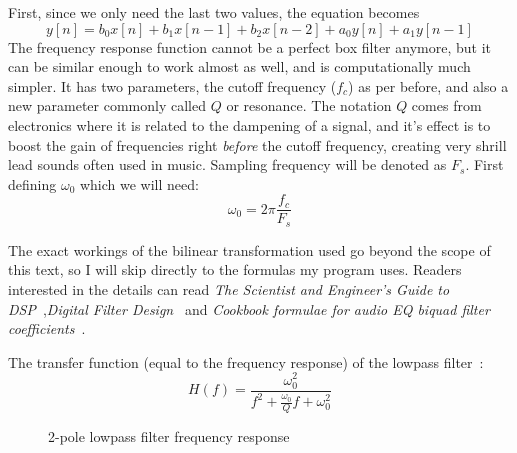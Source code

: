 \documentclass[11pt,a4paper]{article}
\begin{document}
First, since we only need the last two values, the equation becomes
\begin{equation}
y[n] = b_0x[n] + b_1x[n-1] + b_2x[n-2] + a_0y[n] + a_1y[n-1]
\end{equation}
The frequency response function cannot be a perfect box filter anymore, but it can be similar enough to work almost as well, and is computationally much simpler.
It has two parameters, the cutoff frequency (\(f_c\)) as per before, and also a new parameter commonly called \(Q\) or resonance. The notation $Q$ comes from electronics where it is related to the dampening of a signal, and it's effect is to boost the gain of frequencies right \emph{before} the cutoff frequency, creating very shrill lead sounds often used in music.
Sampling frequency will be denoted as \(F_s\).
First defining $\omega_0$ which we will need:
\begin{equation}
\omega_0 = 2{\pi}\frac{f_c}{F_s}
\end{equation}

The exact workings of the bilinear transformation used go beyond the scope of this text, so I will skip directly to the formulas my program uses. Readers interested in the details can read \emph{The Scientist and Engineer's Guide to DSP}~\cite[chap. 33]{SmithDSP},\emph{Digital Filter Design}~\cite[chap. 3.5]{ZoranDFD} and \emph{Cookbook formulae for audio EQ biquad filter coefficients}~\cite{Cookbook}.

The transfer function (equal to the frequency response) of the lowpass filter~\cite[section 8.2]{LinearCircuit}:
\begin{equation}
H(f) = \frac{\omega_0^2}{f^2 + \frac{\omega_0}{Q}f + \omega_0^2}
\end{equation}



\begin{figure}[ht]
\caption{2-pole lowpass filter frequency response}
\centering
{}

\end{figure}
\end{document}
